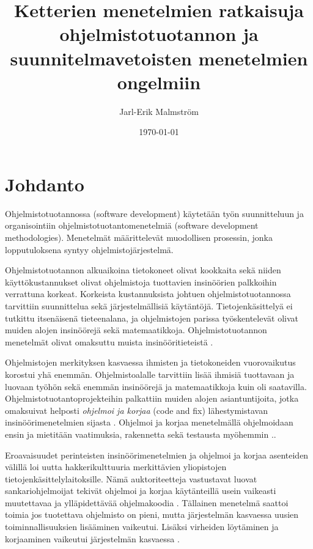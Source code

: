 \documentclass[finnish]{tktltiki2}
\title{Ketterien menetelmien ratkaisuja ohjelmistotuotannon ja suunnitelmavetoisten menetelmien ongelmiin}
\author{Jarl-Erik Malmström}
\date{\today}
\theoremstyle{definition}
\theoremstyle{remark}
\begin{document}
\pagestyle{empty}
\maketitle        %
\makeabstract     %

\tableofcontents  %
\newpage          %



\pagestyle{plain}
\setcounter{page}{1}
\section{Johdanto}

Ohjelmistotuotannossa (software development) käytetään työn suunnitteluun ja organisointiin ohjelmistotuotantomenetelmiä (software development methodologies). Menetelmät määrittelevät muodollisen prosessin, jonka lopputuloksena syntyy ohjelmistojärjestelmä.

Ohjelmistotuotannon alkuaikoina tietokoneet olivat kookkaita sekä niiden käyttö\-kustannukset olivat ohjelmistoja tuottavien insinöörien palkkoihin verrattuna korkeat. Korkeista kustannuksista johtuen ohjelmistotuotannossa tarvittiin suunnittelua sekä järjestelmällisiä käytäntöjä. Tietojenkäsittelyä ei tutkittu itsenäisenä tieteenalana, ja ohjelmistojen parissa työsken\-televät olivat muiden alojen insinöörejä sekä matemaatikkoja. Ohjelmistotuotannon menetelmät olivat omaksuttu muista insinööritieteistä \cite{BOE06}.

Ohjelmistojen merkityksen kasvaessa ihmisten ja tietokoneiden vuorovaikutus korostui yhä enemmän. Ohjelmistoalalle tarvittiin lisää ihmisiä tuottavaan ja luovaan työhön sekä enemmän insinöörejä ja matemaatikkoja kuin oli saatavilla. Ohjelmistotuotantoprojekteihin palkattiin muiden alojen asiantuntijoita, jotka omaksuivat helposti \textit{ohjelmoi ja korjaa} (code and fix) lähestymistavan insinööri\-menetelmien sijasta \cite{BOE06}. Ohjelmoi ja korjaa menetelmällä ohjelmoidaan ensin ja mietitään vaatimuksia, rakennetta sekä testausta myöhemmin .\cite{BOE88}.

Eroavaisuudet perinteisten insinöörimenetelmien ja ohjelmoi ja korjaa asenteiden välillä loi uutta hakkerikulttuuria merkittävien yliopistojen tietojenkäsittelylaitoksille. Nämä auktoriteetteja vastustavat luovat sankariohjelmoijat tekivät ohjelmoi ja korjaa käytänteillä usein vaikeasti muutettavaa ja ylläpidettävää ohjelmakoodia \cite{BOE06}. Tällainen menetelmä saattoi toimia jos tuotettava ohjelmisto on pieni, mutta järjestelmän kasvaessa uusien toiminnallisuuksien lisääminen vaikeutui. Lisäksi virheiden löytäminen ja korjaaminen vaikeutui järjestelmän kasvaessa \cite{FOW01a}.
\end{document}

